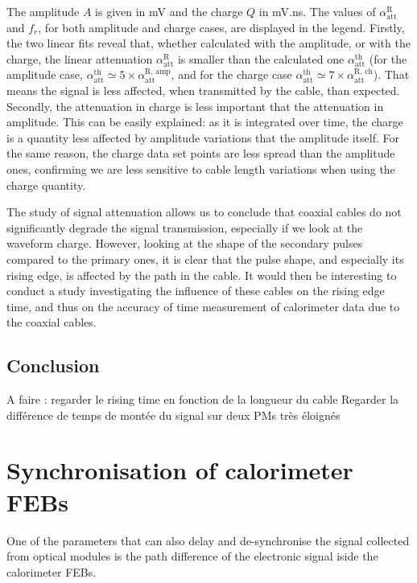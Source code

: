 The amplitude $A$ is given in mV and the charge $Q$ in mV.ns.
The values of $\alpha_{\text{att}}^{\text{R}}$ and $f_{r}$, for both amplitude and charge cases, are displayed in the legend.
Firstly, the two linear fits reveal that, whether calculated with the amplitude, or with the charge, the linear attenuation $\alpha_{\text{att}}^{\text{R}}$ is smaller than the calculated one $\alpha_{\text{att}}^{\text{th}}$ (for the amplitude case, $\alpha_{\text{att}}^{\text{th}}\simeq 5\times \alpha_{\text{att}}^{\text{R, amp}}$, and for the charge case $\alpha_{\text{att}}^{\text{th}}\simeq 7\times \alpha_{\text{att}}^{\text{R, ch}}$).
That means the signal is less affected, when transmitted by the cable, than expected.
Secondly, the attenuation in charge is less important that the attenuation in amplitude.
This can be easily explained: as it is integrated over time, the charge is a quantity less affected by amplitude variations that the amplitude itself.
For the same reason, the charge data set points are less spread than the amplitude ones, confirming we are less sensitive to cable length variations when using the charge quantity.

The study of signal attenuation allows us to conclude that coaxial cables do not significantly degrade the signal transmission, especially if we look at the waveform charge.
However, looking at the shape of the secondary pulses compared to the primary ones, it is clear that the pulse shape, and especially its rising edge, is affected by the path in the cable.
It would then be interesting to conduct a study investigating the influence of these cables on the rising edge time, and thus on the accuracy of time measurement of calorimeter data due to the coaxial cables.

\subsection{Conclusion}

A faire : regarder le rising time en fonction de la longueur du cable
Regarder la différence de temps de montée du signal sur deux PMs très éloignés


\section{Synchronisation of calorimeter FEBs}
\label{sec:timing_FEB}

One of the parameters that can also delay and de-synchronise the signal collected from optical modules is the path difference of the electronic signal iside the calorimeter FEBs.


